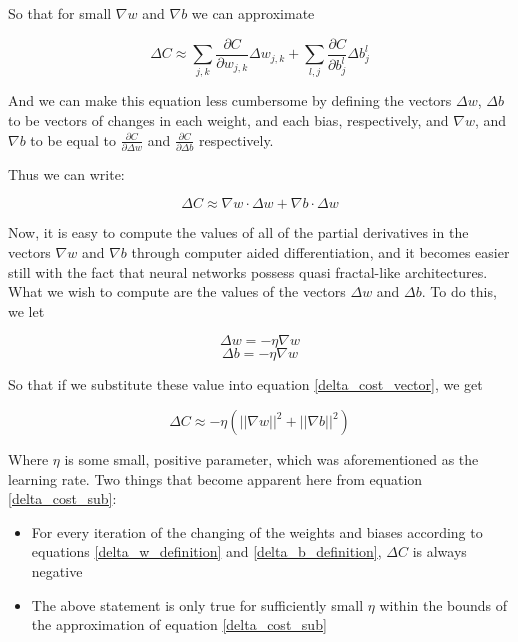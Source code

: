 \documentclass{article}
\begin{document}
So that for small $\nabla w$ and $\nabla b$ we can approximate

\large
\begin{equation}
    \Delta C \approx \sum_{j, k} {\frac{\partial{C}}{\partial{w_{j, k}}} \Delta{w_{j, k}}} + \sum_{l, j}{\frac{\partial{C}}{\partial{b^{l}_{j}}} \Delta b^{l}_{j}}
\end{equation}
\normalsize

And we can make this equation less cumbersome by defining the vectors $\Delta w$, $\Delta b$ to be vectors of changes in each weight, and each bias, respectively, and  $\nabla w$, and $\nabla b$ to be equal to $\frac{\partial C}{\partial \Delta w}$ and $\frac{\partial C}{\partial \Delta b}$ respectively.

Thus we can write:

\large
\begin{equation}
    \Delta C \approx \nabla w \cdot \Delta w + \nabla b \cdot \Delta w \label{delta_cost_vector}
\end{equation}
\normalsize

Now, it is easy to compute the values of all of the partial derivatives in the vectors $\nabla w$ and $\nabla b$ through computer aided differentiation, and it becomes easier still with the fact that neural networks possess quasi fractal-like architectures. What we wish to compute are the values of the vectors $\Delta w$ and $\Delta b$. To do this, we let

\large
\begin{equation}
    \Delta w = - \eta \nabla w \label{delta_w_definition}
\end{equation}
\begin{equation}
    \Delta b = - \eta \nabla w \label{delta_b_definition}
\end{equation}
\normalsize

So that if we substitute these value into equation \eqref{delta_cost_vector}, we get

\large
\begin{equation}
    \Delta C \approx - \eta(||\nabla w||^2 + ||\nabla b||^2) \label{delta_cost_sub}
\end{equation}
\normalsize

Where $\eta$ is some small, positive parameter, which was aforementioned as the learning rate. Two things that become apparent here from equation \eqref{delta_cost_sub}:

\begin{itemize}
    \item For every iteration of the changing of the weights and biases according to equations \eqref{delta_w_definition} and \eqref{delta_b_definition}, $\Delta C$ is always negative
    \item The above statement is only true for sufficiently small $\eta$ within the bounds of the approximation of equation \eqref{delta_cost_sub}
\end{itemize}
\end{document}
